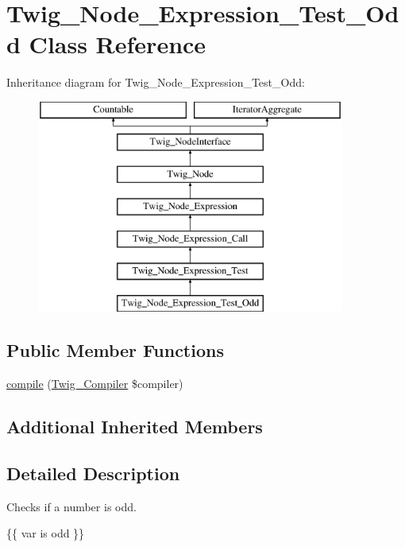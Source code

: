 \hypertarget{classTwig__Node__Expression__Test__Odd}{}\section{Twig\+\_\+\+Node\+\_\+\+Expression\+\_\+\+Test\+\_\+\+Odd Class Reference}
\label{classTwig__Node__Expression__Test__Odd}
Inheritance diagram for Twig\+\_\+\+Node\+\_\+\+Expression\+\_\+\+Test\+\_\+\+Odd\+:\begin{figure}[H]
\begin{center}
\leavevmode
\includegraphics[height=7.000000cm]{classTwig__Node__Expression__Test__Odd}
\end{center}
\end{figure}
\subsection*{Public Member Functions}
\begin{DoxyCompactItemize}
\item 
\hyperlink{classTwig__Node__Expression__Test__Odd_a904a185e02cfe92a998cc0ad6b327bf6}{compile} (\hyperlink{classTwig__Compiler}{Twig\+\_\+\+Compiler} \$compiler)
\end{DoxyCompactItemize}
\subsection*{Additional Inherited Members}


\subsection{Detailed Description}
Checks if a number is odd.


\begin{DoxyPre}
 \{\{ var is odd \}\}
\end{DoxyPre}



